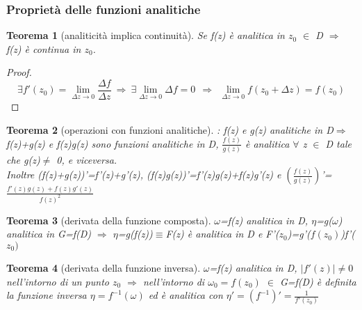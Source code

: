 \documentclass[twoside]{article}
\newtheorem{theorem}{Teorema}[section]
\begin{document}
	\subsubsection{Proprietà delle funzioni analitiche}
    \begin{theorem}[analiticità implica continuità]
	Se f(z) è analitica in $z_0$ $\in$ D $\Longrightarrow$ f(z) è continua in $z_0$.
	\end{theorem}
	\begin{proof} 
	\begin{equation}
	    \exists f'(z_0)=\lim_{\Delta z \to 0} \frac{\Delta f}{\Delta z} \ \Rightarrow \ \exists \lim_{\Delta z \to 0}\Delta f =0 \ \ \Rightarrow \ \ \lim_{\Delta z \to 0}f(z_0+\Delta z)=f(z_0)
	\end{equation}
	\end{proof}
	\begin{theorem}[operazioni con funzioni analitiche]:
	f(z) e g(z) analitiche  in D$\Longrightarrow$ f(z)+g(z) e f(z)g(z) sono funzioni analitiche in D, $\frac{f(z)}{g(z)}$ è analitica $\forall$ z $\in$ D tale che g(z)$\ne$ 0, e viceversa.\\
	Inoltre (f(z)+g(z))'=f'(z)+g'(z), (f(z)g(z))'=f'(z)g(z)+f(z)g'(z) e $\left(\frac{f(z)}{g(z)}\right)$'=$\frac{f'(z)g(z)+f(z)g'(z)}{f(z)^2}$\\
	\end{theorem} 
	\begin{theorem}[derivata della funzione composta]
	$\omega$=f(z) analitica in D, $\eta$=g($\omega$) analitica in G=f(D) $\Longrightarrow$ $\eta$=g(f(z))$\equiv$F(z) è analitica in D e F'($z_0$)=g'($f(z_0)$)f'($z_0)$ \end{theorem}
	\begin{theorem}[derivata della funzione inversa]
	$\omega$=f(z) analitica in D, $|f'(z)|\ne 0$ nell'intorno di un punto $z_0$ $\Longrightarrow$ nell'intorno di $\omega_0=f(z_0)$ $\in$ G=f(D) è definita la funzione inversa $\eta=f^{-1}(\omega)$ ed è analitica con $\eta'=(f^{-1})'=\frac{1}{f'(z_0)}$\end{theorem}
	
\end{document}
